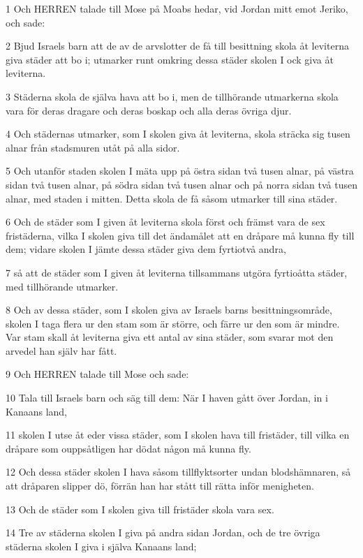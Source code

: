 \par 1 Och HERREN talade till Mose på Moabs hedar, vid Jordan mitt emot Jeriko, och sade:
\par 2 Bjud Israels barn att de av de arvslotter de få till besittning skola åt leviterna giva städer att bo i; utmarker runt omkring dessa städer skolen I ock giva åt leviterna.
\par 3 Städerna skola de själva hava att bo i, men de tillhörande utmarkerna skola vara för deras dragare och deras boskap och alla deras övriga djur.
\par 4 Och städernas utmarker, som I skolen giva åt leviterna, skola sträcka sig tusen alnar från stadsmuren utåt på alla sidor.
\par 5 Och utanför staden skolen I mäta upp på östra sidan två tusen alnar, på västra sidan två tusen alnar, på södra sidan två tusen alnar och på norra sidan två tusen alnar, med staden i mitten. Detta skola de få såsom utmarker till sina städer.
\par 6 Och de städer som I given åt leviterna skola först och främst vara de sex fristäderna, vilka I skolen giva till det ändamålet att en dråpare må kunna fly till dem; vidare skolen I jämte dessa städer giva dem fyrtiotvå andra,
\par 7 så att de städer som I given åt leviterna tillsammans utgöra fyrtioåtta städer, med tillhörande utmarker.
\par 8 Och av dessa städer, som I skolen giva av Israels barns besittningsområde, skolen I taga flera ur den stam som är större, och färre ur den som är mindre. Var stam skall åt leviterna giva ett antal av sina städer, som svarar mot den arvedel han själv har fått.
\par 9 Och HERREN talade till Mose och sade:
\par 10 Tala till Israels barn och säg till dem: När I haven gått över Jordan, in i Kanaans land,
\par 11 skolen I utse åt eder vissa städer, som I skolen hava till fristäder, till vilka en dråpare som ouppsåtligen har dödat någon må kunna fly.
\par 12 Och dessa städer skolen I hava såsom tillflyktsorter undan blodshämnaren, så att dråparen slipper dö, förrän han har stått till rätta inför menigheten.
\par 13 Och de städer som I skolen giva till fristäder skola vara sex.
\par 14 Tre av städerna skolen I giva på andra sidan Jordan, och de tre övriga städerna skolen I giva i själva Kanaans land;
